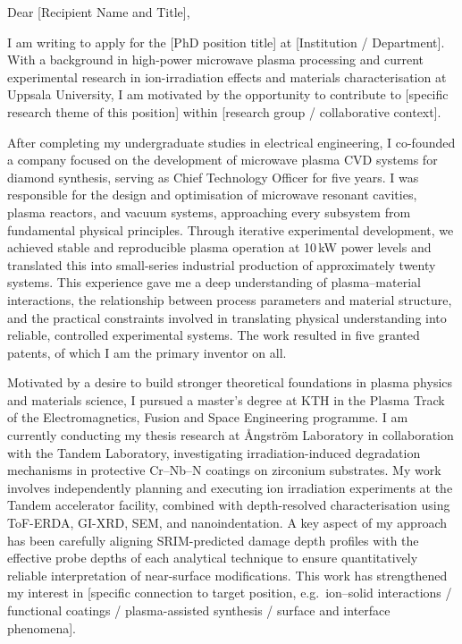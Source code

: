 \documentclass[a4paper,11pt]{article}
\begin{document}
\noindent
Dear [Recipient Name and Title],

\vspace{0.4cm}

I am writing to apply for the [PhD position title] at [Institution / Department].
With a background in high-power microwave plasma processing and current experimental
research in ion-irradiation effects and materials characterisation at Uppsala
University, I am motivated by the opportunity to contribute to [specific research
theme of this position] within [research group / collaborative context].

\vspace{0.3cm}

After completing my undergraduate studies in electrical engineering, I co-founded a
company focused on the development of microwave plasma CVD systems for diamond
synthesis, serving as Chief Technology Officer for five years. I was responsible for
the design and optimisation of microwave resonant cavities, plasma reactors, and
vacuum systems, approaching every subsystem from fundamental physical principles.
Through iterative experimental development, we achieved stable and reproducible
plasma operation at 10\,kW power levels and translated this into small-series
industrial production of approximately twenty systems. This experience gave me a
deep understanding of plasma--material interactions, the relationship between process
parameters and material structure, and the practical constraints involved in
translating physical understanding into reliable, controlled experimental systems.
The work resulted in five granted patents, of which I am the primary inventor on all.

\vspace{0.3cm}

Motivated by a desire to build stronger theoretical foundations in plasma physics and
materials science, I pursued a master's degree at KTH in the Plasma Track of the
Electromagnetics, Fusion and Space Engineering programme. I am currently conducting
my thesis research at Ångström Laboratory in collaboration with the Tandem
Laboratory, investigating irradiation-induced degradation mechanisms in protective
Cr--Nb--N coatings on zirconium substrates. My work involves independently planning
and executing ion irradiation experiments at the Tandem accelerator facility, combined
with depth-resolved characterisation using ToF-ERDA, GI-XRD, SEM, and
nanoindentation. A key aspect of my approach has been carefully aligning
SRIM-predicted damage depth profiles with the effective probe depths of each
analytical technique to ensure quantitatively reliable interpretation of near-surface
modifications. This work has strengthened my interest in [specific connection to
target position, e.g.\ ion--solid interactions / functional coatings / plasma-assisted
synthesis / surface and interface phenomena].
\end{document}
